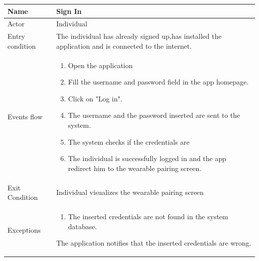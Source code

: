 \begin{tabular}{|l|p{11cm}|}
    \hline
    Name & Sign In
    \\ \hline
    Actor & Individual
    \\ \hline 
    Entry condition & The individual has already signed up,has installed the application and is connected to the internet.
    \\ \hline
    Events flow &
    \begin{enumerate}
    \item Open the application
    \item Fill the username and password field in the app homepage.
    \item Click on "Log in".
    \item The username and the password inserted are sent to the system.
    \item The system checks if the credentials are 
    \item The individual is successfully logged in and the app redirect him to the wearable pairing screen.
    \end{enumerate}
     \\ \hline
     Exit Condition & Individual visualizes the wearable pairing screen
     \\
    \hline
    Exceptions &
     \begin{enumerate}
    \item The inserted credentials are not found in the system database.  
    \end{enumerate}
   The application notifies that the inserted credentials are wrong.
      \\
    \hline
\end{tabular}


